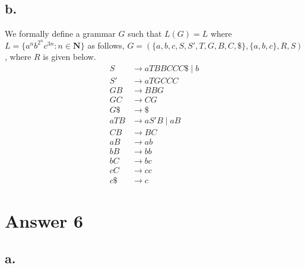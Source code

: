 \documentclass[12pt]{article}
\begin{document}
\subsection*{b.}

We formally define a grammar $G$ such that $L(G) = L$ where $L = \{a^nb^{2^n}c^{3n} \colon n \in \mathbf{N}\}$ as follows, $G = (\{a, b, c, S, S', T, G, B, C, \$\}, \{a, b, c\}, R, S)$, where $R$ is given below.
\begin{equation}
\begin{split}
	S & \rightarrow aTBBCCC\$ \mid b \\
	S' & \rightarrow aTGCCC \\
	GB & \rightarrow BBG \\
	GC & \rightarrow CG \\
	G\$ & \rightarrow \$ \\
	aTB & \rightarrow aS'B \mid aB \\
	CB & \rightarrow BC \\
	aB & \rightarrow ab \\
	bB & \rightarrow bb \\
	bC & \rightarrow bc \\
	cC & \rightarrow cc \\
	c\$ & \rightarrow c
\end{split}
\end{equation}



\section*{Answer 6}

\subsection*{a.}
\end{document}
